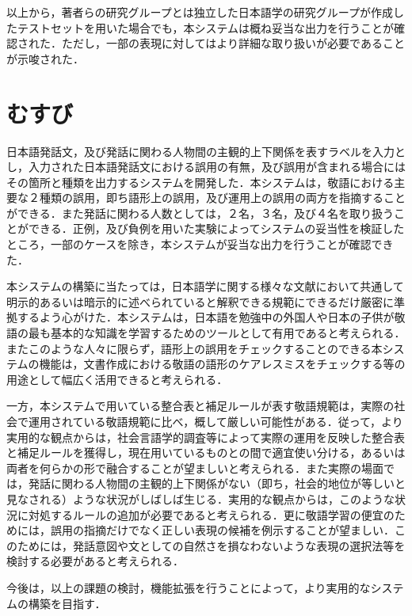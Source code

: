以上から，著者らの研究グループとは独立した日本語学の研究グループが作成したテストセットを用いた場合でも，本システムは概ね妥当な出力を行うことが確認された．ただし，一部の表現に対してはより詳細な取り扱いが必要であることが示唆された．

\section{むすび}
日本語発話文，及び発話に関わる人物間の主観的上下関係を表すラベルを入力とし，入力された日本語発話文における誤用の有無，及び誤用が含まれる場合にはその箇所と種類を出力するシステムを開発した．本システムは，敬語における主要な２種類の誤用，即ち語形上の誤用，及び運用上の誤用の両方を指摘することができる．また発話に関わる人数としては，２名，３名，及び４名を取り扱うことができる．正例，及び負例を用いた実験によってシステムの妥当性を検証したところ，一部のケースを除き，本システムが妥当な出力を行うことが確認できた．

本システムの構築に当たっては，日本語学に関する様々な文献において共通して明示的あるいは暗示的に述べられていると解釈できる規範にできるだけ厳密に準拠するよう心がけた．本システムは，日本語を勉強中の外国人や日本の子供が敬語の最も基本的な知識を学習するためのツールとして有用であると考えられる．またこのような人々に限らず，語形上の誤用をチェックすることのできる本システムの機能は，文書作成における敬語の語形のケアレスミスをチェックする等の用途として幅広く活用できると考えられる．

一方，本システムで用いている整合表と補足ルールが表す敬語規範は，実際の社会で運用されている敬語規範に比べ，概して厳しい可能性がある．従って，より実用的な観点からは，社会言語学的調査等によって実際の運用を反映した整合表と補足ルールを獲得し，現在用いているものとの間で適宜使い分ける，あるいは両者を何らかの形で融合することが望ましいと考えられる．また実際の場面では，発話に関わる人物間の主観的上下関係がない（即ち，社会的地位が等しいと見なされる）ような状況がしばしば生じる．実用的な観点からは，このような状況に対処するルールの追加が必要であると考えられる．更に敬語学習の便宜のためには，誤用の指摘だけでなく正しい表現の候補を例示することが望ましい．このためには，発話意図や文としての自然さを損なわないような表現の選択法等を検討する必要があると考えられる．

今後は，以上の課題の検討，機能拡張を行うことによって，より実用的なシステムの構築を目指す．





